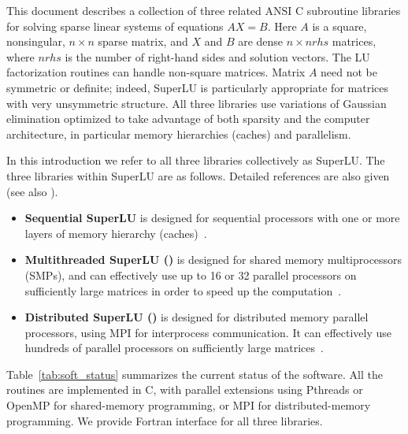This document describes a collection of three related 
ANSI C subroutine libraries for solving sparse linear systems of equations 
$AX=B$. 
Here $A$ is a square, nonsingular, $n\times n$ sparse matrix, and
$X$ and $B$ are dense $n\times nrhs$ matrices, where
$nrhs$ is the number of right-hand sides and solution vectors.
The LU factorization routines can handle non-square matrices.
Matrix $A$ need not be symmetric or definite; indeed, SuperLU is
particularly appropriate for matrices with very unsymmetric structure.
All three libraries use variations of Gaussian elimination optimized
to take advantage of both sparsity and the computer architecture,
in particular memory hierarchies (caches) and parallelism.

In this introduction we refer to all three libraries collectively as SuperLU.
The three libraries within SuperLU are as follows. 
Detailed references are also given (see also \cite{li96}).
\begin{itemize}
\item {\bf Sequential SuperLU} is designed for sequential processors with one
  or more layers of memory hierarchy (caches)~\cite{superlu99}.
\item {\bf Multithreaded SuperLU (\superlumt)} 
is designed for shared memory multiprocessors (SMPs),
and can effectively use up to 16 or 32 parallel processors on sufficiently
large matrices in order to speed up the computation~\cite{superlu_smp99}.
\item {\bf Distributed SuperLU (\superlud)}
is designed for distributed memory parallel
processors, using MPI \cite{mpi-forum} for interprocess communication.
It can effectively use hundreds of parallel processors on sufficiently
large matrices~\cite{lidemmel98,lidemmel03}.
\end{itemize}

Table~\ref{tab:soft_status} summarizes the current status of the software.
All the routines are implemented in C, with parallel extensions
using Pthreads or OpenMP for shared-memory programming, or MPI
for distributed-memory programming. We provide Fortran
interface for all three libraries.

\begin{table}[hptb]
\caption{SuperLU software status.}
\label{tab:soft_status}
\end{table}

